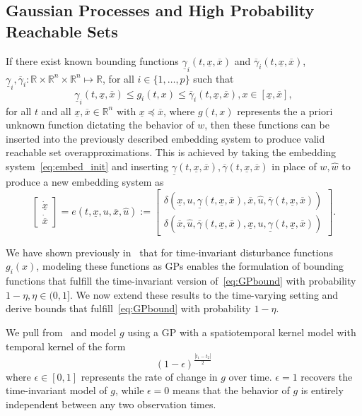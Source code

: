 \documentclass[preprint,12pt]{elsarticle}
\newcommand{\ul}{\underline}
\newcommand{\ol}{\overline}
\begin{document}
\subsection{Gaussian Processes and High Probability Reachable Sets}
\label{section:gp}
If there exist known bounding functions $\ul{\gamma}_i(t, \ul{x}, \ol{x})$ and $\ol{\gamma}_i(t, \ul{x}, \ol{x})$, $\ul{\gamma}_i, \ol{\gamma}_i: \mathbb{R} \times \mathbb{R}^n\times\mathbb{R}^n\mapsto\mathbb{R}$, for all $i\in\{1,\ldots,p\}$ such that 
\begin{equation}
\label{eq:GPbound}
    \ul{\gamma}_i(t, \ul{x},\ol{x}) \leq g_i(t, x) \leq \ol{\gamma}_i(t, \ul{x}, \ol{x}), x \in [\ul{x}, \ol{x}], 
\end{equation}
for all $t$ and all $\ul{x}, \ol{x}\in\mathbb{R}^n$ with $\ul{x}\preceq \ol{x}$, where $g(t, x)$ represents the a priori unknown function dictating the behavior of $w$, then these functions can be inserted into the previously described embedding system to produce valid reachable set overapproximations. This is achieved by taking the embedding system~\eqref{eq:embed_init} and inserting $\ul{\gamma}(t, \ul{x},\ol{x}), \ol{\gamma}(t, \ul{x},\ol{x})$ in place of $w, \widehat{w}$ to produce a new embedding system as
\begin{equation}
\label{eq:emb1}
    \begin{bmatrix}
    \dot{\ul{x}} \\
    \dot{\ol{x}}
    \end{bmatrix} = e(t, \ul{x}, u, \ol{x}, \widehat{u}) :=
    \begin{bmatrix}
    \delta(\ul{x}, u, \ul{\gamma}(t, \ul{x}, \ol{x}), \ol{x},  \widehat{u}, \ol{\gamma}(t, \ul{x}, \ol{x})) \\
    \delta(\ol{x},  \widehat{u}, \ol{\gamma}(t, \ul{x}, \ol{x}), \ul{x},  u, \ul{\gamma}(t, \ul{x}, \ol{x}))
    \end{bmatrix}.
\end{equation}


We have shown previously in~\cite{caoMMGPOJCSYS} that for time-invariant disturbance functions $g_i(x)$, modeling these functions as GPs enables the formulation of bounding functions that fulfill the time-invariant version of~\eqref{eq:GPbound} with probability $1-\eta, \eta\in(0, 1]$. We now extend these results to the time-varying setting and derive bounds that fulfill~\eqref{eq:GPbound} with probability $1-\eta$.

We pull from~\cite{bogunovicTVGP} and model $g$ using a \ac{GP} with a spatiotemporal kernel model with temporal kernel of the form
\begin{equation}
    (1-\epsilon)^\frac{|t_1-t_2|}{2}
    \label{eq:time_kernel}
\end{equation}
where $\epsilon \in [0, 1]$ represents the rate of change in $g$ over time. $\epsilon=1$ recovers the time-invariant model of $g$, while $\epsilon = 0$ means that the behavior of $g$ is entirely independent between any two observation times.
\end{document}
